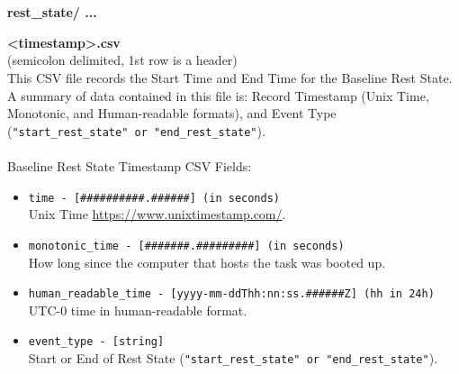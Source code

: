 \begin{description}
\begin{addmargin}[0em]{0em}
    \end{addmargin} %


    \textbf{\\\\}
    \begin{addmargin}[0em]{0em} %
        \textbf{rest\_state/ ...}

        \begin{addmargin}[1em]{0em} %
            \textbf{<timestamp>.csv}\\(semicolon delimited, 1st row is a header)\\
            This CSV file records the Start Time and End Time for the Baseline Rest State.
            A summary of data contained in this file is: Record Timestamp (Unix Time, Monotonic, and Human-readable formats),
            and Event Type (\verb|"start_rest_state" or "end_rest_state"|).\\\\
            Baseline Rest State Timestamp CSV Fields:
            \begin{itemize}
                \item \verb|time - [##########.######] (in seconds)|\\Unix Time \href{https://www.unixtimestamp.com/}{https://www.unixtimestamp.com/}.
                \item \verb|monotonic_time - [#######.#########] (in seconds)|\\How long since the computer that hosts the task was booted up.
                \item \verb|human_readable_time - [yyyy-mm-ddThh:nn:ss.######Z] (hh in 24h)|\\UTC-0 time in human-readable format.
                \item \verb|event_type - [string]|\\Start or End of Rest State (\verb|"start_rest_state" or "end_rest_state"|).
            \end{itemize}
        \end{addmargin} %

    \end{addmargin} %
    




\end{description}
